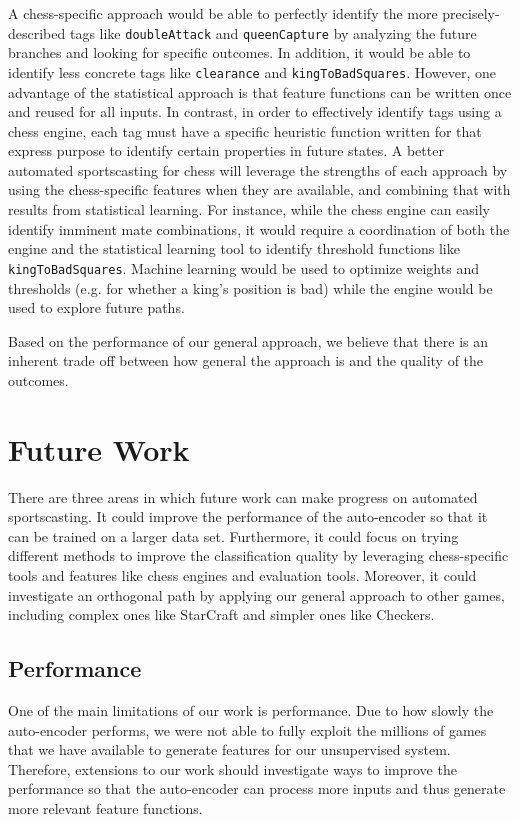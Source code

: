 \documentclass[11pt]{article}
\begin{document}
A chess-specific approach would be able to perfectly identify the more precisely-described tags like {\tt doubleAttack} and {\tt queenCapture} by analyzing the future branches and looking for specific outcomes. In addition, it would be able to identify less concrete tags like {\tt clearance} and {\tt kingToBadSquares}. However, one advantage of the statistical approach is that feature functions can be written once and reused for all inputs. In contrast, in order to effectively identify tags using a chess engine, each tag must have a specific heuristic function written for that express purpose to identify certain properties in future states. A better automated sportscasting for chess will leverage the strengths of each approach by using the chess-specific features when they are available, and combining that with results from statistical learning. For instance, while the chess engine can easily identify imminent mate combinations, it would require a coordination of both the engine and the statistical learning tool to identify threshold functions like {\tt kingToBadSquares}. Machine learning would be used to optimize weights and thresholds (e.g. for whether a king’s position is bad) while the engine would be used to explore future paths.

Based on the performance of our general approach, we believe that there is an inherent trade off between how general the approach is and the quality of the outcomes. 

\section{Future Work}
There are three areas in which future work can make progress on automated sportscasting. It could improve the performance of the auto-encoder so that it can be trained on a larger data set. Furthermore, it could focus on trying different methods to improve the classification quality by leveraging chess-specific tools and features like chess engines and evaluation tools. Moreover, it could investigate an orthogonal path by applying our general approach to other games, including complex ones like StarCraft and simpler ones like Checkers.

\subsection{Performance}
One of the main limitations of our work is performance. Due to how slowly the auto-encoder performs, we were not able to fully exploit the millions of games that we have available to generate features for our unsupervised system. Therefore, extensions to our work should investigate ways to improve the performance so that the auto-encoder can process more inputs and thus generate more relevant feature functions.
\end{document}
